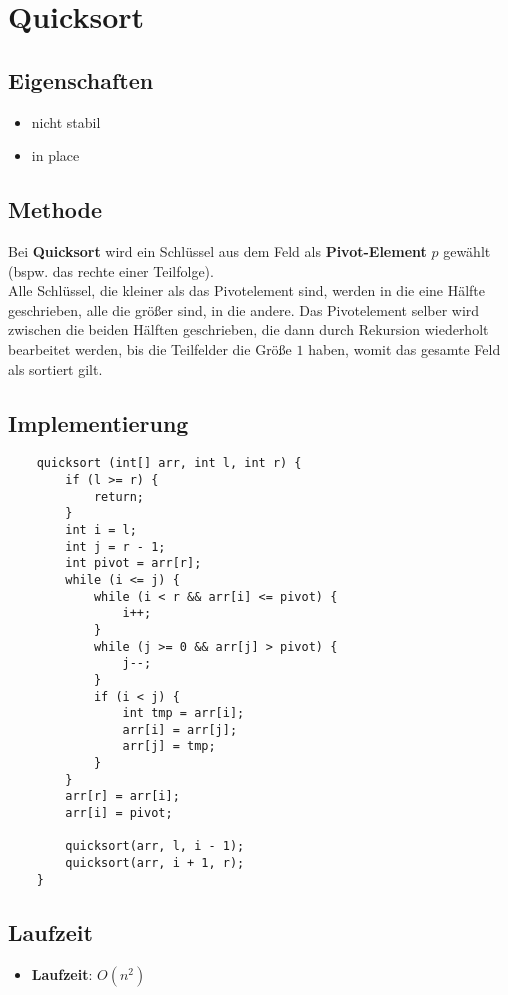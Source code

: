 \section{Quicksort}


\subsection{Eigenschaften}
\begin{itemize}
    \item nicht stabil
    \item in place
\end{itemize}

\subsection{Methode}
Bei \textbf{Quicksort}  wird ein Schlüssel aus dem Feld als \textbf{Pivot-Element} $p$ gewählt (bspw. das rechte einer Teilfolge).\\
Alle Schlüssel, die kleiner als das Pivotelement sind, werden in die eine Hälfte geschrieben, alle die größer sind, in die andere.
Das Pivotelement selber wird zwischen die beiden Hälften geschrieben, die dann durch Rekursion wiederholt bearbeitet werden, bis die Teilfelder die Größe $1$ haben, womit das gesamte Feld als sortiert gilt.


\subsection{Implementierung}
\begin{verbatim}
    quicksort (int[] arr, int l, int r) {
        if (l >= r) {
            return;
        }
        int i = l;
        int j = r - 1;
        int pivot = arr[r];
        while (i <= j) {
            while (i < r && arr[i] <= pivot) {
                i++;
            }
            while (j >= 0 && arr[j] > pivot) {
                j--;
            }
            if (i < j) {
                int tmp = arr[i];
                arr[i] = arr[j];
                arr[j] = tmp;
            }
        }
        arr[r] = arr[i];
        arr[i] = pivot;

        quicksort(arr, l, i - 1);
        quicksort(arr, i + 1, r);
    }
\end{verbatim}


\subsection{Laufzeit}
\begin{itemize}
    \item \textbf{Laufzeit}: $O(n^2)$
\end{itemize}

